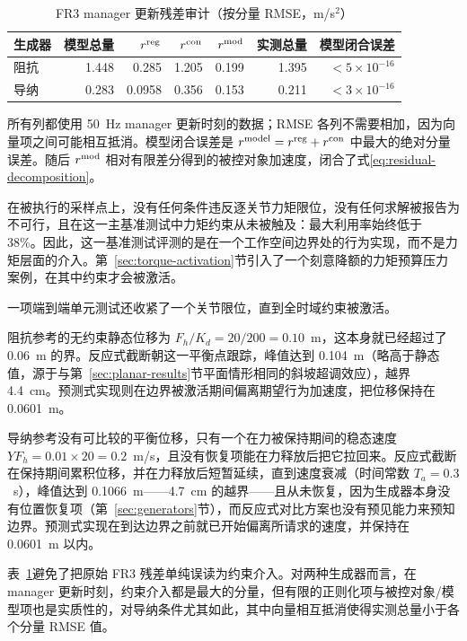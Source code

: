 \documentclass[journal]{IEEEtran}
\begin{document}
\begin{table}[t]
\centering
\caption{FR3 manager 更新残差审计（按分量 RMSE，m/s$^2$）}
\label{tab:fr3-decomposition}
\small
\begin{tabular}{@{}lrrrrrr@{}}
\toprule
生成器 & 模型总量 & $r^{\rm reg}$ & $r^{\rm con}$ & $r^{\rm mod}$ & 实测总量 & 模型闭合误差 \\
\midrule
阻抗  & 1.448 & 0.285 & 1.205 & 0.199 & 1.395 & $<5\!\times\!10^{-16}$ \\
导纳 & 0.283 & 0.0958 & 0.356 & 0.153 & 0.211 & $<3\!\times\!10^{-16}$ \\
\bottomrule
\end{tabular}

\vspace{2pt}
\raggedright\footnotesize
所有列都使用 50~Hz manager 更新时刻的数据；RMSE 各列不需要相加，因为向量项之间可能相互抵消。模型闭合误差是 $r^{\rm model}=r^{\rm reg}+r^{\rm con}$ 中最大的绝对分量误差。随后 $r^{\rm mod}$ 相对有限差分得到的被控对象加速度，闭合了式\eqref{eq:residual-decomposition}。
\end{table}

在被执行的采样点上，没有任何条件违反逐关节力矩限位，没有任何求解被报告为不可行，且在这一主基准测试中力矩约束从未被触及：最大利用率始终低于 38\%。因此，这一基准测试评测的是在一个工作空间边界处的行为实现，而不是力矩层面的介入。第~\ref{sec:torque-activation}节引入了一个刻意降额的力矩预算压力案例，在其中约束才会被激活。

一项端到端单元测试还收紧了一个关节限位，直到全时域约束被激活。

阻抗参考的无约束静态位移为 $F_h/K_d=20/200=0.10$~m，这本身就已经超过了 0.06~m 的界。反应式截断朝这一平衡点跟踪，峰值达到 0.104~m（略高于静态值，源于与第~\ref{sec:planar-results}节平面情形相同的斜坡超调效应），越界 4.4~cm。预测式实现则在边界被激活期间偏离期望行为加速度，把位移保持在 0.0601~m。

导纳参考没有可比较的平衡位移，只有一个在力被保持期间的稳态速度 $Y F_h=0.01\times20=0.2$~m/s，且没有恢复项能在力释放后把它拉回来。反应式截断在保持期间累积位移，并在力释放后短暂延续，直到速度衰减（时间常数 $T_a=0.3$~s），峰值达到 0.1066~m——4.7~cm 的越界——且从未恢复，因为生成器本身没有位置恢复项（第~\ref{sec:generators}节），而反应式对比方案也没有预见能力来预知边界。预测式实现在到达边界之前就已开始偏离所请求的速度，并保持在 0.0601~m 以内。

表~\ref{tab:fr3-decomposition}避免了把原始 FR3 残差单纯误读为约束介入。对两种生成器而言，在 manager 更新时刻，约束介入都是最大的分量，但有限的正则化项与被控对象/模型项也是实质性的，对导纳条件尤其如此，其中向量相互抵消使得实测总量小于各个分量 RMSE 值。
\end{document}
